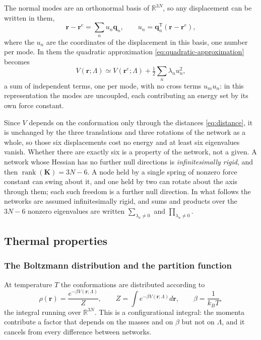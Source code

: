 \documentclass[11pt]{article}
\newcommand{\rr}{\mathbf{r}}
\newcommand{\KK}{\mathbf{K}}
\newcommand{\LL}{\Lambda}
\newcommand{\re}{\rr^{e}}
\begin{document}
The normal modes are an orthonormal basis of $\mathbb{R}^{3N}$, so any displacement can be written in them,
\begin{equation}
\rr - \re = \sum_n u_n \mathbf{q}_n,
\qquad
u_n = \mathbf{q}_n^{\mathsf T} (\rr - \re),
\label{eq:normal-mode-coordinates}
\end{equation}
where the $u_n$ are the coordinates of the displacement in this basis, one number per mode.
In them the quadratic approximation \eqref{eq:quadratic-approximation} becomes
\begin{equation}
\boxed{
V(\rr;\LL) \simeq V(\re;\LL) + \tfrac12 \sum_n \lambda_n u_n^{2} ,
}
\label{eq:modal-potential}
\end{equation}
a sum of independent terms, one per mode, with no cross terms $u_m u_n$: in this representation the modes are uncoupled, each contributing an energy set by its own force constant.

Since $V$ depends on the conformation only through the distances \eqref{eq:distance}, it is unchanged by the three translations and three rotations of the network as a whole, so those six displacements cost no energy and at least six eigenvalues vanish.
Whether there are exactly six is a property of the network, not a given.
A network whose Hessian has no further null directions is \emph{infinitesimally rigid}, and then $\operatorname{rank}(\KK) = 3N-6$.
A node held by a single spring of nonzero force constant can swing about it, and one held by two can rotate about the axis through them; each such freedom is a further null direction.
In what follows the networks are assumed infinitesimally rigid,
and sums and products over the $3N-6$ nonzero eigenvalues are written
$\sum_{\lambda_n \ne 0}$ and $\prod_{\lambda_n \ne 0}$.

\subsection{Thermal properties}
\label{sec:thermo}

\subsubsection{The Boltzmann distribution and the partition function}

At temperature $T$ the conformations are distributed according to
\begin{equation}
\rho(\rr) = \frac{e^{-\beta V(\rr;\LL)}}{Z},
\qquad
Z = \int e^{-\beta V(\rr;\LL)} d\rr,
\qquad
\beta = \frac{1}{k_B T},
\label{eq:boltzmann-distribution}
\end{equation}
the integral running over $\mathbb{R}^{3N}$.
This is a configurational integral: the momenta contribute a factor that depends on the masses and on $\beta$ but not on $\LL$, and it cancels from every difference between networks.
\end{document}
